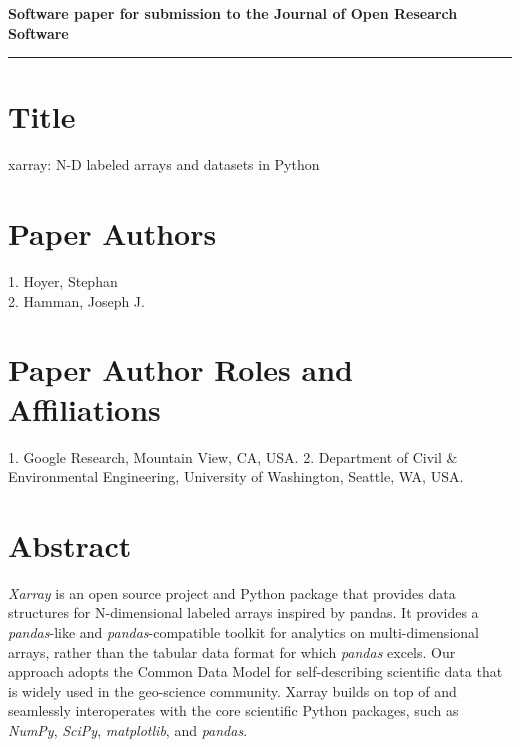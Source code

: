 \documentclass{jors}
\begin{document}
{\bf Software paper for submission to the Journal of Open Research Software} \\

%


\rule{\textwidth}{1pt}

\vspace{0.5cm}

\section*{Title}

xarray: N-D labeled arrays and datasets in Python

\section*{Paper Authors}

{1. Hoyer, Stephan \\
 2. Hamman, Joseph J.}

\section*{Paper Author Roles and Affiliations}
{1. Google Research, Mountain View, CA, USA. 2. Department of Civil \& Environmental Engineering, University of Washington, Seattle, WA, USA.}


\section*{Abstract}

\textit{Xarray} is an open source project and Python package that provides data structures for N-dimensional labeled arrays inspired by pandas.
It provides a \textit{pandas}-like and \textit{pandas}-compatible toolkit for analytics on multi-dimensional arrays, rather than the tabular data format for which \textit{pandas} excels.
Our approach adopts the Common Data Model for self-describing scientific data that is widely used in the geo-science community.
Xarray builds on top of and seamlessly interoperates with the core scientific Python packages, such as \textit{NumPy}, \textit{SciPy}, \textit{matplotlib}, and \textit{pandas}.
\end{document}
